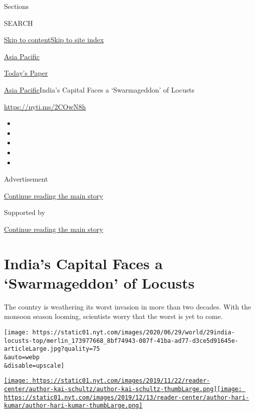 Sections

SEARCH

\protect\hyperlink{site-content}{Skip to
content}\protect\hyperlink{site-index}{Skip to site index}

\href{https://www.nytimes.com/section/world/asia}{Asia Pacific}

\href{https://myaccount.nytimes.com/auth/login?response_type=cookie\&client_id=vi}{}

\href{https://www.nytimes.com/section/todayspaper}{Today's Paper}

\href{/section/world/asia}{Asia Pacific}\textbar{}India's Capital Faces
a `Swarmageddon' of Locusts

\url{https://nyti.ms/2COwN8h}

\begin{itemize}
\item
\item
\item
\item
\item
\end{itemize}

Advertisement

\protect\hyperlink{after-top}{Continue reading the main story}

Supported by

\protect\hyperlink{after-sponsor}{Continue reading the main story}

\hypertarget{indias-capital-faces-a-swarmageddon-of-locusts}{%
\section{India's Capital Faces a `Swarmageddon' of
Locusts}\label{indias-capital-faces-a-swarmageddon-of-locusts}}

The country is weathering its worst invasion in more than two decades.
With the monsoon season looming, scientists worry that the worst is yet
to come.

\texttt{[image: https://static01.nyt.com/images/2020/06/29/world/29india-locusts-top/merlin\_173977668\_8bf74943-087f-41ba-ad77-d3ce5d91645e-articleLarge.jpg?quality=75\\\&auto=webp\\\&disable=upscale]}

\href{https://www.nytimes.com/by/kai-schultz}{\texttt{[image: https://static01.nyt.com/images/2019/11/22/reader-center/author-kai-schultz/author-kai-schultz-thumbLarge.png]}}\href{https://www.nytimes.com/by/hari-kumar}{\texttt{[image: https://static01.nyt.com/images/2019/12/13/reader-center/author-hari-kumar/author-hari-kumar-thumbLarge.png]}}

